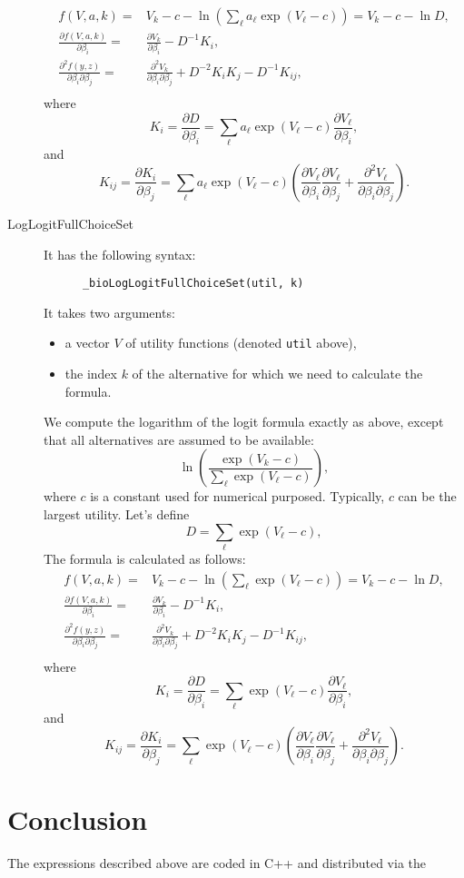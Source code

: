 \documentclass[12pt,a4paper]{article}
\begin{document}
\begin{description}
  \begin{align*}
    f(V, a, k) =& V_k - c -\ln(\sum_\ell a_\ell\exp(V_\ell-c)) = V_k - c-\ln D, \\
    \frac{\partial f(V, a, k)}{\partial \beta_i} =&  \frac{\partial V_k}{\partial \beta_i} - D^{-1} K_i, \\ 
    \frac{\partial^2 f(y, z)}{\partial \beta_i \partial \beta_j} =&
    \frac{\partial^2 V_k}{\partial \beta_i \partial \beta_j} + D^{-2} K_i K_j - D^{-1} K_{ij},\\
  \end{align*}
  where
  \[
K_i = \frac{\partial D}{\partial \beta_i} = \sum_\ell a_\ell\exp(V_\ell-c) \frac{\partial V_\ell}{\partial \beta_i},
\]
and
\[
K_{ij} = \frac{\partial K_i}{\partial \beta_j} = \sum_\ell a_\ell\exp(V_\ell-c) \left(
\frac{\partial V_\ell}{\partial \beta_i} \frac{\partial V_\ell}{\partial \beta_j} +
\frac{\partial^2 V_\ell}{\partial \beta_i \partial \beta_j}
\right).
\]
\item[LogLogitFullChoiceSet] It has the following syntax:
    \begin{lstlisting}
      _bioLogLogitFullChoiceSet(util, k)
  \end{lstlisting}
It takes two arguments:
\begin{itemize}
\item a vector $V$ of utility functions (denoted \verb+util+ above),
\item the index $k$ of the alternative for which we need to calculate the formula.
\end{itemize}
We compute the logarithm of the logit formula exactly as above, except that all alternatives are assumed to be available:
\[
\ln\left(\frac{\exp(V_k-c)}{\sum_\ell \exp(V_\ell -c)}\right),
\]
where $c$ is a constant used for numerical purposed. Typically, $c$ can be the largest utility.
Let's define
\[
D = \sum_{\ell} \exp(V_\ell - c),
\]
The formula is calculated as follows:
  \begin{align*}
    f(V, a, k) =& V_k - c -\ln(\sum_\ell \exp(V_\ell-c)) = V_k - c-\ln D, \\
    \frac{\partial f(V, a, k)}{\partial \beta_i} =&  \frac{\partial V_k}{\partial \beta_i} - D^{-1} K_i, \\ 
    \frac{\partial^2 f(y, z)}{\partial \beta_i \partial \beta_j} =&
    \frac{\partial^2 V_k}{\partial \beta_i \partial \beta_j} + D^{-2} K_i K_j - D^{-1} K_{ij},\\
  \end{align*}
  where
  \[
K_i = \frac{\partial D}{\partial \beta_i} = \sum_\ell \exp(V_\ell-c) \frac{\partial V_\ell}{\partial \beta_i},
\]
and
\[
K_{ij} = \frac{\partial K_i}{\partial \beta_j} = \sum_\ell \exp(V_\ell-c) \left(
\frac{\partial V_\ell}{\partial \beta_i} \frac{\partial V_\ell}{\partial \beta_j} +
\frac{\partial^2 V_\ell}{\partial \beta_i \partial \beta_j}
\right).
\]

\end{description}



\section{Conclusion}

The expressions described above are coded in C++ and distributed via the 





\end{document}
